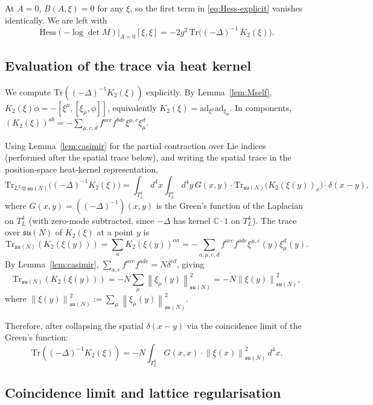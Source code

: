 \documentclass[11pt,a4paper]{amsart}
\theoremstyle{definition}
\newcommand{\C}{\mathbb{C}}
\newcommand{\su}{\mathfrak{su}}
\newcommand{\norm}[1]{\left\lVert#1\right\rVert}
\newcommand{\Tr}{\mathrm{Tr}}
\newcommand{\ad}{\mathrm{ad}}
\newcommand{\Hess}{\mathrm{Hess}}
\begin{document}
At $A = 0$, $B(A, \xi) = 0$ for any $\xi$, so the first term in
\eqref{eq:Hess-explicit} vanishes identically. We are left with
\begin{equation}\label{eq:Hess-vac}
\Hess(-\log\det M)|_{A=0}[\xi, \xi] = -2 g^2 \, \Tr\bigl((-\Delta)^{-1} \, K_2(\xi)\bigr).
\end{equation}

\subsection{Evaluation of the trace via heat kernel}

We compute $\Tr((-\Delta)^{-1} K_2(\xi))$ explicitly. By Lemma~\ref{lem:Mself},
$K_2(\xi)\phi = -[\xi^\mu, [\xi_\mu, \phi]]$, equivalently
$K_2(\xi) = \ad_{\xi^\mu} \ad_{\xi_\mu}$. In components,
$(K_2(\xi))^{ab} = -\sum_{\mu, c, d} f^{ace} f^{bde} \xi^{\mu, c} \xi_\mu^d$.

Using Lemma~\ref{lem:casimir} for the partial contraction over Lie indices
(performed after the spatial trace below), and writing the spatial trace
in the position-space heat-kernel representation,
\[
\Tr_{L^2 \otimes \su(N)}\bigl((-\Delta)^{-1} K_2(\xi)\bigr)
= \int_{T^4_L} \! d^4 x \int_{T^4_L} \! d^4 y \, G(x, y) \cdot \Tr_{\su(N)}\bigl(K_2(\xi(y))_x\bigr) \cdot \delta(x - y),
\]
where $G(x, y) = ((-\Delta)^{-1})(x, y)$ is the Green's function of the
Laplacian on $T^4_L$ (with zero-mode subtracted, since $-\Delta$ has kernel
$\C \cdot 1$ on $T^4_L$). The trace over $\su(N)$ of $K_2(\xi)$ at a point $y$ is
\[
\Tr_{\su(N)}(K_2(\xi(y))) = \sum_{a} K_2(\xi(y))^{aa}
= -\sum_{a, \mu, c, d} f^{ace}f^{ade} \xi^{\mu, c}(y) \xi_\mu^d(y).
\]
By Lemma~\ref{lem:casimir}, $\sum_{a, e} f^{ace} f^{ade} = N \delta^{cd}$,
giving
\[
\Tr_{\su(N)}(K_2(\xi(y))) = -N \sum_\mu \norm{\xi_\mu(y)}^2_{\su(N)}
= -N \norm{\xi(y)}^2_{\su(N)},
\]
where $\norm{\xi(y)}^2_{\su(N)} := \sum_\mu \norm{\xi_\mu(y)}^2_{\su(N)}$.

Therefore, after collapsing the spatial $\delta(x-y)$ via the
coincidence limit of the Green's function:
\begin{equation}\label{eq:trace-vac}
\Tr((-\Delta)^{-1} K_2(\xi)) = -N \int_{T^4_L} G(x, x) \cdot \norm{\xi(x)}^2_{\su(N)} \,d^4 x.
\end{equation}

\subsection{Coincidence limit and lattice regularisation}\label{ssec:coincidence}
\end{document}
